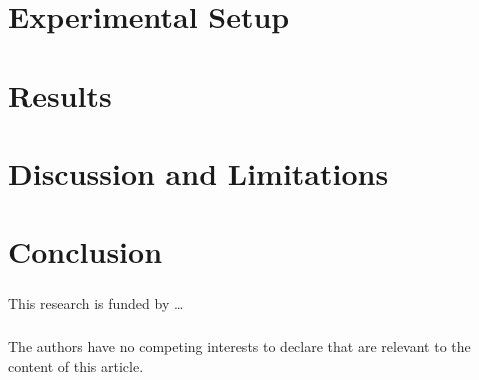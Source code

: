 \documentclass[runningheads]{llncs}
\begin{document}
\section{Experimental Setup} 
\section{Results}          
\section{Discussion and Limitations} 
\section{Conclusion}       

\begin{credits}
\subsubsection{\ackname} This research is funded by \ldots

\subsubsection{\discintname}
The authors have no competing interests to declare that are relevant to
the content of this article.
\end{credits}

% 


\end{document}
